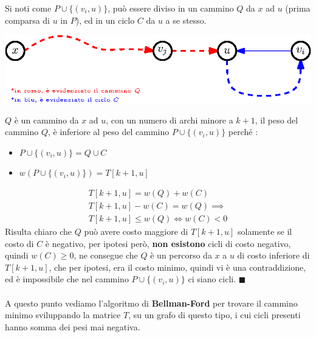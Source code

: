 \documentclass[12pt, letterpaper]{article}
\newcommand{\acc}{\\\hphantom{}\\}
\begin{document}
Si noti come $P\cup \{(v_i,u)\}$, può essere diviso in un cammino $Q$ da $x$ ad $u$ (prima comparsa di $u$ in $P$), ed in 
un ciclo $C$ da $u$ a se stesso.\begin{center}
    \includegraphics[width=1\textwidth ]{images/dimNoCicli2.eps}
\end{center}
$Q$ è un cammino da $x$ ad $u$, con un numero di archi minore a $k+1$, il peso del cammino $Q$, è inferiore al peso 
del cammino $P\cup \{(v_i,u)\}$ perché : \begin{itemize}
    \item $P\cup \{(v_i,u)\} = Q\cup C$
    \item $w(P\cup \{(v_i,u)\})=T[k+1,u]$
\end{itemize}\begin{eqnarray}
    T[k+1,u] = w(Q) + w(C) \\
    T[k+1,u] - w(C) = w(Q) \implies  \\
    T[k+1,u] \le w(Q) \iff w(C)<0
\end{eqnarray} 
Risulta chiaro che $Q$ può avere costo maggiore di $T[k+1,u]$ solamente se il costo di $C$ è negativo, per ipotesi però, 
\textbf{non esistono} cicli di costo negativo, quindi $w(C)\ge 0$, ne consegue che $Q$ è un percorso da $x$ a $u$ di costo 
inferiore di $T[k+1,u]$, che per ipotesi, era il costo minimo, quindi vi è una contraddizione, ed è impossibile che 
nel cammino   $P\cup\{(v_i,u)\}$ ci siano cicli. $\blacksquare$\acc 
A questo punto vediamo l'algoritmo di \textbf{Bellman-Ford} per trovare il cammino minimo sviluppando la matrice $T$, su un 
grafo di questo tipo, i cui cicli presenti hanno somma dei pesi mai negativa. 
\end{document}
